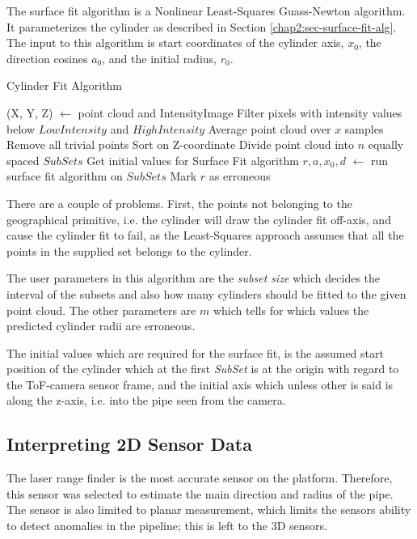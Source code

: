 The surface fit algorithm is a Nonlinear Least-Squares Guass-Newton algorithm. It
parameterizes the cylinder as described in Section \ref{chap2:sec-surface-fit-alg}. The input to this
algorithm is start coordinates of the cylinder axis, $x_0$, the direction cosines $a_0$, and
the initial radius, $r_0$.

\begin{algorithm}[htbp]
    \caption{Cylinder Fit Algorithm}
    \label{chap5:alg-cylinderfit}
    \begin{algorithmic}
        \REQUIRE (X, Y, Z) $\leftarrow$ point cloud and IntensityImage
        \STATE Filter pixels with intensity values below $LowIntensity$ and $HighIntensity$
        \STATE Average point cloud over $x$ samples
        \STATE Remove all trivial points
        \STATE Sort on Z-coordinate
        \STATE Divide point cloud into $n$ equally spaced $SubSets$
            \STATE Get initial values for Surface Fit algorithm
            \STATE  $r, a, x_0, d$ $\leftarrow$ run surface fit algorithm on $SubSets$
        \ENDFOR
                \STATE Mark $r$ as erroneous
            \ENDIF
        \ENDFOR
    \end{algorithmic}
\end{algorithm}

There are a couple of problems. First, the points not belonging to the geographical
primitive, i.e. the cylinder will draw the cylinder fit off-axis, and cause the cylinder
fit to fail, as the Least-Squares approach assumes that all the points in the supplied set
belongs to the cylinder. 

The user parameters in this algorithm are the \emph{subset size} which decides the interval
of the subsets and also how many cylinders should be fitted to the given point cloud. The
other parameters are $m$ which tells for which values the predicted cylinder radii are
erroneous. 

The initial values which are required for the surface fit, is the assumed start position
of the cylinder which at the first \emph{SubSet} is at the origin with regard to the
ToF-camera sensor frame, and the initial axis which unless other is said is along the
z-axis, i.e. into the pipe seen from the camera.


\subsection{Interpreting 2D Sensor Data}
The laser range finder is the most accurate sensor on the platform. Therefore, this
sensor was selected to estimate the main direction and radius of the pipe. The sensor is
also limited to planar measurement, which limits the sensors ability to detect anomalies
in the pipeline; this is left to the 3D sensors. 

